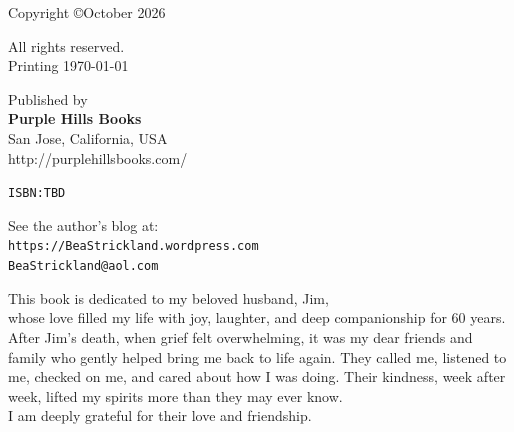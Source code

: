 \clearpage
{
Copyright \copyright   October 2026    
\newline

    \noindent
    All rights reserved.\\
    Printing \today
    \newline

    \noindent
    Published by \\
    \textbf{Purple Hills Books}\\
    San Jose, California, USA\\
    http://purplehillsbooks.com/


    \vspace{0.25in}
    \noindent
    \texttt{ISBN:TBD}

    \vspace{0.75in}
    \noindent
    See the author's blog at:\\
    \texttt{https://BeaStrickland.wordpress.com}\\
    \texttt{BeaStrickland@aol.com}
}
\clearpage
\vspace{1.75in}
\begin{center}
This book is dedicated to my beloved husband, Jim,\\
whose love filled my life with joy, laughter, and deep companionship for 60 years.\\

\vspace{0.25in}
After Jim's death, when grief felt overwhelming, it was my dear friends and family who gently helped bring me back to life again. They called me, listened to me, checked on me, and cared about how I was doing. Their kindness, week after week, lifted my spirits more than they may ever know.\\

\vspace{0.25in}
I am deeply grateful for their love and friendship.\\

\end{center}

\cleardoublepage
\tableofcontents
\cleardoublepage





\mainmatter

















\appendix



\backmatter

\providecommand{\phantomsection}{}
\cleardoublepage
\phantomsection
{}
\printindex


